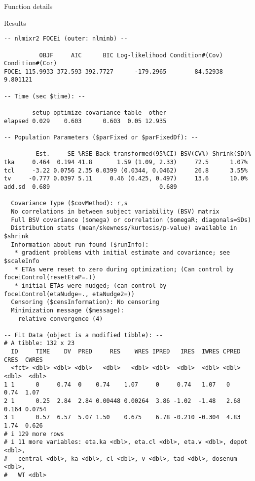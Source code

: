 \documentclass[
  ignorenonframetext,
]{beamer}
\begin{document}
\begin{frame}{Function details}
\label{function-details}
\end{frame}

\begin{frame}[fragile]{Results}
\label{results}
\begin{verbatim}
-- nlmixr2 FOCEi (outer: nlminb) --

          OBJF     AIC      BIC Log-likelihood Condition#(Cov) Condition#(Cor)
FOCEi 115.9933 372.593 392.7727      -179.2965        84.52938        9.801121

-- Time (sec $time): --

        setup optimize covariance table  other
elapsed 0.029    0.603      0.603  0.05 12.935

-- Population Parameters ($parFixed or $parFixedDf): --

         Est.     SE %RSE Back-transformed(95%CI) BSV(CV%) Shrink(SD)%
tka     0.464  0.194 41.8       1.59 (1.09, 2.33)     72.5      1.07% 
tcl     -3.22 0.0756 2.35 0.0399 (0.0344, 0.0462)     26.8      3.55% 
tv     -0.777 0.0397 5.11     0.46 (0.425, 0.497)     13.6      10.0% 
add.sd  0.689                               0.689                     
 
  Covariance Type ($covMethod): r,s
  No correlations in between subject variability (BSV) matrix
  Full BSV covariance ($omega) or correlation ($omegaR; diagonals=SDs) 
  Distribution stats (mean/skewness/kurtosis/p-value) available in $shrink 
  Information about run found ($runInfo):
   * gradient problems with initial estimate and covariance; see $scaleInfo 
   * ETAs were reset to zero during optimization; (Can control by foceiControl(resetEtaP=.)) 
   * initial ETAs were nudged; (can control by foceiControl(etaNudge=., etaNudge2=)) 
  Censoring ($censInformation): No censoring
  Minimization message ($message):  
    relative convergence (4) 

-- Fit Data (object is a modified tibble): --
# A tibble: 132 x 23
  ID     TIME    DV  PRED     RES    WRES IPRED   IRES  IWRES CPRED  CRES  CWRES
  <fct> <dbl> <dbl> <dbl>   <dbl>   <dbl> <dbl>  <dbl>  <dbl> <dbl> <dbl>  <dbl>
1 1      0     0.74  0    0.74    1.07     0     0.74   1.07   0    0.74  1.07  
2 1      0.25  2.84  2.84 0.00448 0.00264  3.86 -1.02  -1.48   2.68 0.164 0.0754
3 1      0.57  6.57  5.07 1.50    0.675    6.78 -0.210 -0.304  4.83 1.74  0.626 
# i 129 more rows
# i 11 more variables: eta.ka <dbl>, eta.cl <dbl>, eta.v <dbl>, depot <dbl>,
#   central <dbl>, ka <dbl>, cl <dbl>, v <dbl>, tad <dbl>, dosenum <dbl>,
#   WT <dbl>
\end{verbatim}
\end{frame}
\end{document}
